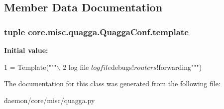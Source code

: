 \subsection{Member Data Documentation}
\hypertarget{classcore_1_1misc_1_1quagga_1_1_quagga_conf_a3cbd7f2780ef75284a1d5cf16b35879a}{
\subsubsection[{template}]{\setlength{\rightskip}{0pt plus 5cm}tuple core.\+misc.\+quagga.\+Quagga\+Conf.\+template\hspace{0.3cm}{\ttfamily [static]}}}\label{classcore_1_1misc_1_1quagga_1_1_quagga_conf_a3cbd7f2780ef75284a1d5cf16b35879a}
{\bfseries Initial value\+:}
\begin{DoxyCode}
1 = Template(\textcolor{stringliteral}{"""\(\backslash\)}
2 \textcolor{stringliteral}{log file $logfile$debugs!$routers!$forwarding"""})
\end{DoxyCode}


The documentation for this class was generated from the following file\+:\begin{DoxyCompactItemize}
\item 
daemon/core/misc/quagga.\+py\end{DoxyCompactItemize}
